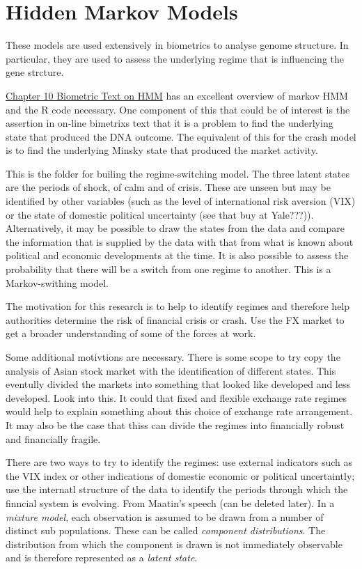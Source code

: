\documentclass[12pt, a4paper, oneside]{article} %
\begin{document}
\section{Hidden Markov Models}
These models are used extensively in biometrics to analyse genome structure.  In particular, they are used to assess the underlying regime that is influencing the gene strcture. 

\href{http://a-little-book-of-r-for-bioinformatics.readthedocs.org/en/latest/src/chapter10.html}{Chapter 10 Biometric Text on HMM}
has an excellent overview of markov HMM and the R code necessary. One component of this that could be of interest is the assertion in on-line bimetrixs text that it is a problem to find the underlying state that produced the DNA outcome.  The equivalent of this for the crash model is to find the underlying Minsky state that produced the market activity. 

This is the folder for builing the regime-switching model. The three latent states are the periods of shock, of calm and of crisis.  These are unseen but may be identified by other variables (such as the level of international risk aversion (VIX) or the state of domestic political uncertainty (see that buy at Yale???)).  Alternatively, it may be possible to draw the states from the data and compare the information that is supplied by the data with that from what is known about political and economic developments at the time.  It is also possible to assess the probability that there will be a switch from one regime to another.  This is a Markov-swithing model. 

The motivation for this research is to help to identify regimes and therefore help authorities determine the risk of financial crisis or crash. Use the FX market to get a broader understanding of some of the forces at work.

Some additional motivtions are necessary. There is some scope to try copy the analysis of Asian stock market with the identification of different states.  This eventully divided the markets into something that looked like developed and less developed. Look into this.  It could that fixed and flexible exchange rate regimes would help to explain something about this choice of exchange rate arrangement.  It may also be the case that thiss can divide the regimes into financially robust and financially fragile. 

There are two ways to try to identify the regimes: use external indicators such as the VIX index or other indications of domestic economic or political uncertaintly; use the internatl structure of the data to identify the periods through which the finncial system  is evolving. 
From Maatin's speech (can be deleted later).  In a \emph{mixture model}, each observation is assumed to be drawn from a number of distinct sub populations.  These can be called \emph{component distributions}.  The distribution from which the component is drawn is not immediately observable and is therefore represented as a \emph{latent state}. 
\end{document}
